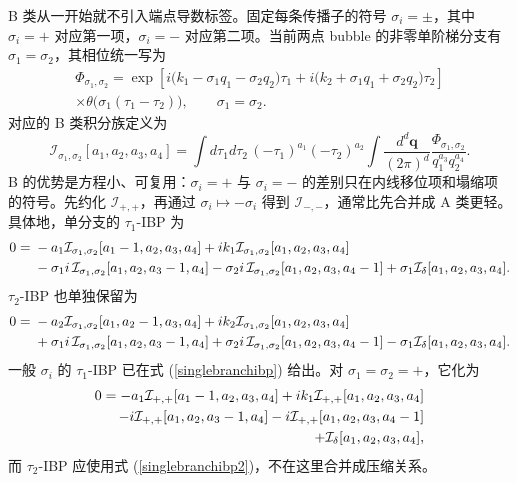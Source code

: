 ﻿\documentclass[a4paper,11pt]{article}
\begin{document}
B 类从一开始就不引入端点导数标签。固定每条传播子的符号 $\sigma_i=\pm$，其中 $\sigma_i=+$ 对应第一项，$\sigma_i=-$ 对应第二项。当前两点 bubble 的非零单阶梯分支有 $\sigma_1=\sigma_2$，其相位统一写为
\begin{multline}
    \Phi_{\sigma_1,\sigma_2}=
    \exp\!\left[
    i\bigl(k_1-\sigma_1 q_1-\sigma_2 q_2\bigr)\tau_1
    +i\bigl(k_2+\sigma_1 q_1+\sigma_2 q_2\bigr)\tau_2
    \right]\\
    \times\theta\!\bigl(\sigma_1(\tau_1-\tau_2)\bigr),\qquad \sigma_1=\sigma_2.
    \label{singlebranchphase}
\end{multline}
对应的 B 类积分族定义为
\begin{equation}
    \mathcal{I}_{\sigma_1,\sigma_2}[a_1,a_2,a_3,a_4]
    =
    \int d\tau_1d\tau_2\,(-\tau_1)^{a_1}(-\tau_2)^{a_2}
    \int\frac{d^d\boldsymbol{q}}{(2\pi)^d}
    \frac{\Phi_{\sigma_1,\sigma_2}}{q_1^{a_3}q_2^{a_4}}.
\end{equation}
B 的优势是方程小、可复用：$\sigma_i=+$ 与 $\sigma_i=-$ 的差别只在内线移位项和塌缩项的符号。先约化 $\mathcal{I}_{+,+}$，再通过 $\sigma_i\mapsto-\sigma_i$ 得到 $\mathcal{I}_{-,-}$，通常比先合并成 A 类更轻。具体地，单分支的 $\tau_1$-IBP 为
\begin{align}
    0={}&-a_1\mathcal{I}_{\sigma_1,\sigma_2}[a_1-1,a_2,a_3,a_4]
    +ik_1\mathcal{I}_{\sigma_1,\sigma_2}[a_1,a_2,a_3,a_4]\notag\\
    &-\sigma_1 i\,\mathcal{I}_{\sigma_1,\sigma_2}[a_1,a_2,a_3-1,a_4]
    -\sigma_2 i\,\mathcal{I}_{\sigma_1,\sigma_2}[a_1,a_2,a_3,a_4-1]
    +\sigma_1\mathcal{I}_{\delta}[a_1,a_2,a_3,a_4].
    \label{singlebranchibp}
\end{align}
$\tau_2$-IBP 也单独保留为
\begin{align}
    0={}&-a_2\mathcal{I}_{\sigma_1,\sigma_2}[a_1,a_2-1,a_3,a_4]
    +ik_2\mathcal{I}_{\sigma_1,\sigma_2}[a_1,a_2,a_3,a_4]\notag\\
    &+\sigma_1 i\,\mathcal{I}_{\sigma_1,\sigma_2}[a_1,a_2,a_3-1,a_4]
    +\sigma_2 i\,\mathcal{I}_{\sigma_1,\sigma_2}[a_1,a_2,a_3,a_4-1]
    -\sigma_1\mathcal{I}_{\delta}[a_1,a_2,a_3,a_4].
    \label{singlebranchibp2}
\end{align}
一般 $\sigma_i$ 的 $\tau_1$-IBP 已在式 (\ref{singlebranchibp}) 给出。对 $\sigma_1=\sigma_2=+$，它化为
\begin{align}
    0=-a_1\mathcal{I}_{+,+}[a_1-1,a_2,a_3,a_4]+ik_1\mathcal{I}_{+,+}[a_1,a_2,a_3,a_4]\notag\\
    -i\mathcal{I}_{+,+}[a_1,a_2,a_3-1,a_4]-i\mathcal{I}_{+,+}[a_1,a_2,a_3,a_4-1]\notag\\
    +\mathcal{I}_{\delta}[a_1,a_2,a_3,a_4],
\end{align}
而 $\tau_2$-IBP 应使用式 (\ref{singlebranchibp2})，不在这里合并成压缩关系。
\end{document}
